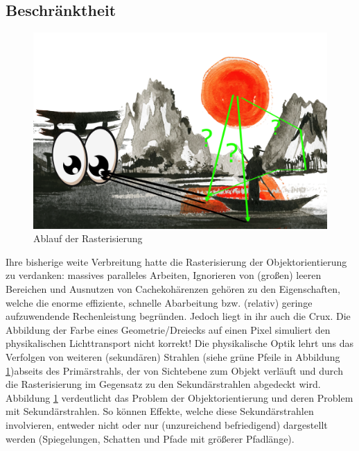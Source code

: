         \subsection{Beschränktheit}
        \label{sec:Rasterisierung:Beschränktheit}
        
        \begin{figure}[H]
            \begin{tcolorbox}
            \centering
            \includegraphics[width=\linewidth]{content/PathTracer/Bilder/RasterizerGuide.png}
            \end{tcolorbox}
            \caption{Ablauf der Rasterisierung}
            \label{pic:RasterizerGuide}
        \end{figure}

        Ihre bisherige weite Verbreitung hatte die Rasterisierung der Objektorientierung zu verdanken: massives paralleles Arbeiten, Ignorieren von (großen) leeren Bereichen und
        Ausnutzen von Cachekohärenzen gehören zu den Eigenschaften, welche die enorme effiziente, schnelle Abarbeitung bzw. (relativ) geringe aufzuwendende Rechenleistung begründen.
        Jedoch liegt in ihr auch die Crux.
        Die Abbildung der Farbe eines Geometrie/Dreiecks auf einen Pixel simuliert
        den physikalischen Lichttransport nicht korrekt! Die physikalische Optik lehrt uns das Verfolgen von weiteren (sekundären) Strahlen 
        (siehe grüne Pfeile in Abbildung \ref{pic:RasterizerGuide})abseits des Primärstrahls, der von 
        Sichtebene zum Objekt verläuft und durch die Rasterisierung im Gegensatz zu den Sekundärstrahlen abgedeckt wird. Abbildung \ref{pic:RasterizerGuide} verdeutlicht das 
        Problem der Objektorientierung und deren Problem mit Sekundärstrahlen. So können Effekte, welche diese Sekundärstrahlen involvieren, 
        entweder nicht oder nur (unzureichend befriedigend) dargestellt werden (Spiegelungen, Schatten und Pfade mit größerer Pfadlänge). \par

